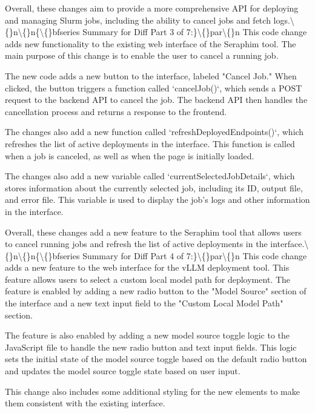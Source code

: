 \documentclass{article}
\begin{document}
{Overall, these changes aim to provide a more comprehensive API for deploying and managing Slurm jobs, including the ability to cancel jobs and fetch logs.\textbackslash\{\}n\textbackslash\{\}n\{\textbackslash\{\}bfseries Summary for Diff Part 3 of 7:\}\textbackslash\{\}par\textbackslash\{\}n  This code change adds new functionality to the existing web interface of the Seraphim tool. The main purpose of this change is to enable the user to cancel a running job.

The new code adds a new button to the interface, labeled "Cancel Job." When clicked, the button triggers a function called `cancelJob()`, which sends a POST request to the backend API to cancel the job. The backend API then handles the cancellation process and returns a response to the frontend.

The changes also add a new function called `refreshDeployedEndpoints()`, which refreshes the list of active deployments in the interface. This function is called when a job is canceled, as well as when the page is initially loaded.

The changes also add a new variable called `currentSelectedJobDetails`, which stores information about the currently selected job, including its ID, output file, and error file. This variable is used to display the job's logs and other information in the interface.

Overall, these changes add a new feature to the Seraphim tool that allows users to cancel running jobs and refresh the list of active deployments in the interface.\textbackslash\{\}n\textbackslash\{\}n\{\textbackslash\{\}bfseries Summary for Diff Part 4 of 7:\}\textbackslash\{\}par\textbackslash\{\}n  This code change adds a new feature to the web interface for the vLLM deployment tool. This feature allows users to select a custom local model path for deployment. The feature is enabled by adding a new radio button to the "Model Source" section of the interface and a new text input field to the "Custom Local Model Path" section.

The feature is also enabled by adding a new model source toggle logic to the JavaScript file to handle the new radio button and text input fields. This logic sets the initial state of the model source toggle based on the default radio button and updates the model source toggle state based on user input.

This change also includes some additional styling for the new elements to make them consistent with the existing interface.

}
\end{document}
